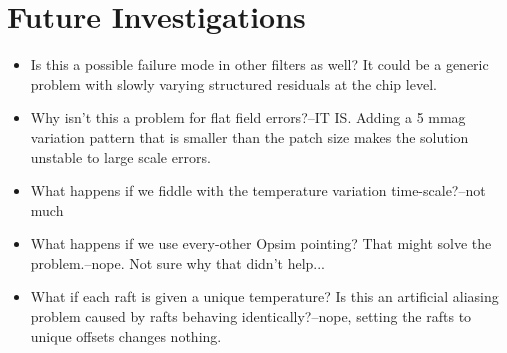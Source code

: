 \section{Future Investigations}
\begin{itemize}
\item{Is this a possible failure mode in other filters as well?  It could be a generic problem with slowly varying structured residuals at the chip level.}
\item{Why isn't this a problem for flat field errors?--IT IS.  Adding a 5 mmag variation pattern that is smaller than the patch size makes the solution unstable to large scale errors.}
\item{What happens if we fiddle with the temperature variation time-scale?--not much}
\item{What happens if we use every-other Opsim pointing?  That might solve the problem.--nope.  Not sure why that didn't help...}
\item{What if each raft is given a unique temperature?  Is this an artificial aliasing problem caused by rafts behaving identically?--nope, setting the rafts to unique offsets changes nothing.}
\end{itemize}
